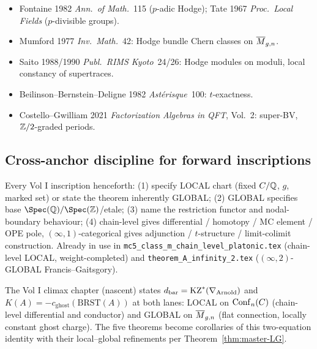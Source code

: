\begin{itemize}
$p \mid 2n!$.
\item Fontaine 1982 \emph{Ann.\ of Math.}\ 115 ($p$-adic Hodge); Tate
1967 \emph{Proc.\ Local Fields} ($p$-divisible groups).
\item Mumford 1977 \emph{Inv.\ Math.}\ 42: Hodge bundle Chern classes
on $\overline{M}_{g,n}$.
\item Saito 1988/1990 \emph{Publ.\ RIMS Kyoto}\ 24/26: Hodge modules
on moduli, local constancy of supertraces.
\item Beilinson--Bernstein--Deligne 1982 \emph{Ast\'erisque}\ 100:
$t$-exactness.
\item Costello--Gwilliam 2021 \emph{Factorization Algebras in QFT}, Vol.\
2: super-BV, $\mathbb{Z}/2$-graded periods.
\end{itemize}

\subsection*{Cross-anchor discipline for forward inscriptions}

Every Vol I inscription henceforth: (1) specify LOCAL chart
(fixed $C/\mathbb{Q}$, $g$, marked set) or state the theorem inherently
GLOBAL; (2) GLOBAL specifies base $\Spec(\QQ)/\Spec(\ZZ)$/etale;
(3) name the restriction functor and nodal-boundary behaviour;
(4) chain-level gives differential / homotopy / MC element / OPE pole,
$(\infty,1)$-categorical gives adjunction / $t$-structure /
limit-colimit construction. Already in use in
\texttt{mc5\_class\_m\_chain\_level\_platonic.tex} (chain-level LOCAL,
weight-completed) and \texttt{theorem\_A\_infinity\_2.tex}
($(\infty,2)$-GLOBAL Francis--Gaitsgory).

The Vol I climax chapter (nascent) states $d_{\mathrm{bar}} =
\mathrm{KZ}^*(\nabla_{\mathrm{Arnold}})$ and $K(A) = -c_{\mathrm{ghost}}(\mathrm{BRST}(A))$
at both lanes: LOCAL on $\mathrm{Conf}_n(C)$ (chain-level differential and
conductor) and GLOBAL on $\overline{M}_{g,n}$ (flat connection, locally
constant ghost charge). The five theorems become corollaries of this
two-equation identity with their local--global refinements per
Theorem~\ref{thm:master-LG}.
